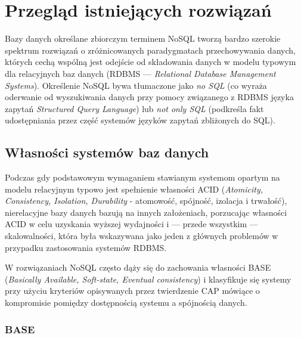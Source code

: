 \chapter{Przegląd istniejących rozwiązań} \label{chapter:existingsolutions}

Bazy danych określane zbiorczym terminem NoSQL tworzą bardzo szerokie spektrum rozwiązań o zróżnicowanych paradygmatach przechowywania danych, których cechą wspólną jest odejście od składowania danych w modelu typowym dla relacyjnych baz danych (RDBMS --- \textit{Relational Database Management Systems}). Określenie NoSQL bywa tłumaczone jako \textit{no SQL} (co wyraża oderwanie od wyszukiwania danych przy pomocy związanego z RDBMS języka zapytań \textit{Structured Query Language}) lub \textit{not only SQL} (podkreśla fakt udostępniania przez część systemów języków zapytań zbliżonych do SQL).

\section{Własności systemów baz danych}

Podczas gdy podstawowym wymaganiem stawianym systemom opartym na modelu relacyjnym typowo jest spełnienie własności ACID (\textit{Atomicity, Consistency, Isolation, Durability} - atomowość, spójność, izolacja i trwałość), nierelacyjne bazy danych bazują na innych założeniach, porzucając własności ACID w celu uzyskania wyższej wydajności i --- przede wszystkim --- skalowalności, która była wskazywana jako jeden z głównych problemów w przypadku zastosowania systemów RDBMS.

W rozwiązaniach NoSQL często dąży się do zachowania własności BASE (\textit{Basically Available, Soft-state, Eventual consistency}) i klasyfikuje się systemy przy użyciu kryteriów opisywanych przez twierdzenie CAP mówiące o kompromisie pomiędzy dostępnością systemu a spójnością danych.

\subsection{BASE}


